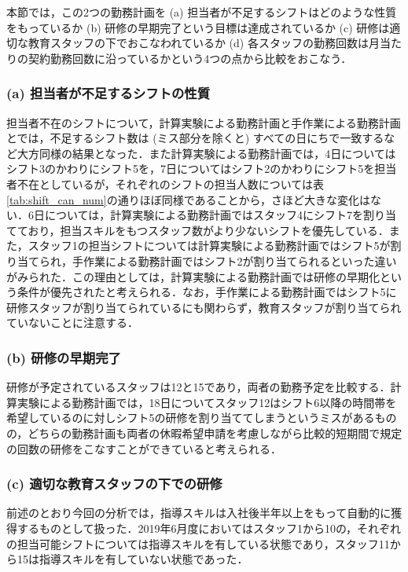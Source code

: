 \documentclass[twocolumn]{jsarticle}
\begin{document}
本節では，この2つの勤務計画を (a) 担当者が不足するシフトはどのような性質をもっているか (b) 研修の早期完了という目標は達成されているか (c) 研修は適切な教育スタッフの下でおこなわれているか (d) 各スタッフの勤務回数は月当たりの契約勤務回数に沿っているかという4つの点から比較をおこなう．

\vspace{\baselineskip}
\subsubsection*{(a) 担当者が不足するシフトの性質}
担当者不在のシフトについて，計算実験による勤務計画と手作業による勤務計画とでは，不足するシフト数は (ミス部分を除くと) すべての日にちで一致するなど大方同様の結果となった．また計算実験による勤務計画では，4日についてはシフト3のかわりにシフト5を，7日についてはシフト2のかわりにシフト5を担当者不在としているが，それぞれのシフトの担当人数については表\ref{tab:shift_can_num}の通りほぼ同様であることから，さほど大きな変化はない．6日については，計算実験による勤務計画ではスタッフ4にシフト7を割り当てており，担当スキルをもつスタッフ数がより少ないシフトを優先している．また，スタッフ1の担当シフトについては計算実験による勤務計画ではシフト5が割り当てられ，手作業による勤務計画ではシフト2が割り当てられるといった違いがみられた．この理由としては，計算実験による勤務計画では研修の早期化という条件が優先されたと考えられる．なお，手作業による勤務計画ではシフト5に研修スタッフが割り当てられているにも関わらず，教育スタッフが割り当てられていないことに注意する．

\vspace{\baselineskip}
\subsubsection*{(b) 研修の早期完了}
研修が予定されているスタッフは12と15であり，両者の勤務予定を比較する．計算実験による勤務計画では，18日についてスタッフ12はシフト6以降の時間帯を希望しているのに対しシフト5の研修を割り当ててしまうというミスがあるものの，どちらの勤務計画も両者の休暇希望申請を考慮しながら比較的短期間で規定の回数の研修をこなすことができていると考えられる．

\vspace{\baselineskip}
\subsubsection*{(c) 適切な教育スタッフの下での研修}
前述のとおり今回の分析では，指導スキルは入社後半年以上をもって自動的に獲得するものとして扱った．2019年6月度においてはスタッフ1から10の，それぞれの担当可能シフトについては指導スキルを有している状態であり，スタッフ11から15は指導スキルを有していない状態であった．
\end{document}
